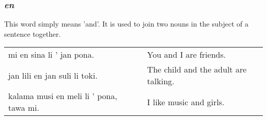 \subsubsection*{\textit{en}}
%
This word simply means 'and'. 
It is used to join two nouns in the subject of a sentence together. 

\begin{supertabular}{p{5,5cm}|ll}
mi en sina li ' jan pona. && You and I are friends. \\
jan lili en jan suli li toki. && The child and the adult are talking. \\
kalama musi en meli li ' pona, tawa mi. && I like music and girls. \\
\end{supertabular} 

